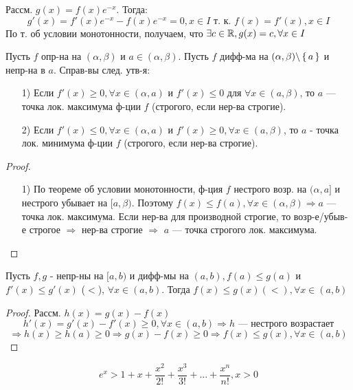\begin{solution}
Рассм. $g(x) = f(x) e^{-x}$. Тогда:
\[
g'(x) = f'(x) e^{-x} - f(x) e^{-x} = 0, x \in I \text{ т. к. } f(x) = f'(x), x \in I
\]
По т. об условии монотонности, получаем, что $\exists c \in \mathbb{R}, g(x) = c, \forall x \in I$
\end{solution}
\begin{consequence}
Пусть $f$ опр-на на $(\alpha, \beta)$ и $a \in (\alpha, \beta)$. Пусть $f$ дифф-ма на $(\alpha, \beta) \backslash \set{a}$ и непр-на в $a$. Справ-вы след. утв-я:
\begin{itemize}
  \item [1) ] Если $f'(x) \geq 0, \forall x \in (\alpha, a)$ и $f'(x) \leq 0$ для $\forall x \in (a, \beta)$, то $a$ --- точка лок. максимума ф-ции $f$ (строгого, если нер-ва строгие).
  \item [2) ] Если $f'(x) \leq 0, \forall x \in (\alpha, a)$ и $f'(x) \geq 0, \forall x \in (a, \beta)$, то $a$ - точка лок. минимума ф-ции $f$ (строгого, если нер-ва строгие).
\end{itemize}
\end{consequence}
\begin{proof}
\begin{itemize}
  \item [1) ] По теореме об условии монотонности, ф-ция $f$ нестрого возр. на $(\alpha, a]$ и нестрого убывает на $[a, \beta)$. Поэтому $f(x) \leq f(a), \forall x \in (\alpha, \beta) \Rightarrow a$ --- точка лок. максимума. Если нер-ва для производной строгие, то возр-е/убыв-е строгое $\Rightarrow$ нер-ва строгие $\Rightarrow$ $a$ --- точка строгого лок. максимума.
\end{itemize}
\end{proof}
\begin{consequence}
Пусть $f, g$ - непр-ны на $[a, b)$ и дифф-мы на $(a, b), f(a) \leq g(a) $ и $f'(x) \leq g'(x)$ ($<$), $\forall x \in (a, b)$. Тогда $f(x) \leq g(x) (<), \forall x \in (a, b)$
\end{consequence}
\begin{proof}
Рассм. $h(x) = g(x) - f(x)$
\[
h'(x) = g'(x) - f'(x) \geq 0, \forall x \in (a, b) \Rightarrow h \text{ --- нестрого возрастает}
\]
\[
\Rightarrow h(x) \geq h(a) \geq 0 \Rightarrow g(x) - f(x) \geq 0 \Rightarrow f(x) \leq g(x), \forall x \in (a, b)
\]
\end{proof}
\begin{example}
\[
e^{x} > 1 + x + \frac{x^{2}}{2!} + \frac{x^{3}}{3!} + \ldots + \frac{x^{n}}{n!}, x > 0
\]
\end{example}
